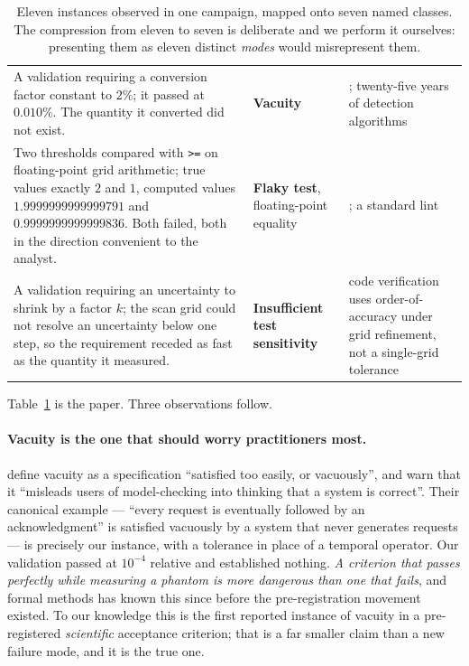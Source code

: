 \documentclass[11pt,a4paper]{article}
\begin{document}
\begin{table}[t]
\begin{tabular}{p{4.9cm}p{3.6cm}p{5.9cm}}
\addlinespace
A validation requiring a conversion factor constant to $2\%$; it passed at $0.010\%$. The
quantity it converted did not exist. &
\textbf{Vacuity} & \citet{beer1997,kupferman2003}; twenty-five years of detection algorithms \\
\addlinespace
Two thresholds compared with \texttt{>=} on floating-point grid arithmetic; true values
exactly $2$ and $1$, computed values $1.9999999999999791$ and $0.9999999999999836$. Both
failed, both in the direction convenient to the analyst. &
\textbf{Flaky test}, floating-point equality & \citet{luo2014}; a standard lint \\
\addlinespace
A validation requiring an uncertainty to shrink by a factor $k$; the scan grid could not
resolve an uncertainty below one step, so the requirement receded as fast as the quantity it
measured. &
\textbf{Insufficient test sensitivity} & code verification uses order-of-accuracy under grid
refinement, not a single-grid tolerance \citep{salari2000,roache1998} \\
\bottomrule
\end{tabular}
\caption{Eleven instances observed in one campaign, mapped onto seven named classes. The
compression from eleven to seven is deliberate and we perform it ourselves: presenting them
as eleven distinct \emph{modes} would misrepresent them.}
\label{tab:mapping}
\end{table}

Table~\ref{tab:mapping} is the paper. Three observations follow.

\paragraph{Vacuity is the one that should worry practitioners most.} \citet{beer1997} define
vacuity as a specification ``satisfied too easily, or vacuously'', and warn that it
``misleads users of model-checking into thinking that a system is correct''. Their canonical
example --- ``every request is eventually followed by an acknowledgment'' is satisfied
vacuously by a system that never generates requests --- is precisely our instance, with a
tolerance in place of a temporal operator. Our validation passed at $10^{-4}$ relative and
established nothing. \emph{A criterion that passes perfectly while measuring a phantom is
more dangerous than one that fails}, and formal methods has known this since before the
pre-registration movement existed. To our knowledge this is the first reported instance of
vacuity in a pre-registered \emph{scientific} acceptance criterion; that is a far smaller
claim than a new failure mode, and it is the true one.
\end{document}
